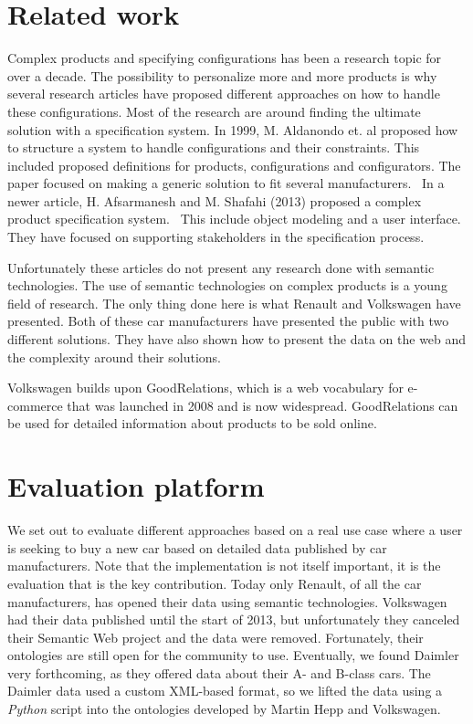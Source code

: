 \documentclass{llncs}
\begin{document}
\section{Related work}
Complex products and specifying configurations has been a research
topic for over a decade.  The possibility to personalize more and more
products is why several research articles have proposed different
approaches on how to handle these configurations. Most of the research
are around finding the ultimate solution with a specification
system. In 1999, M. Aldanondo et. al proposed how to structure a
system to handle configurations and their constraints. This included
proposed definitions for products, configurations and
configurators. The paper focused on making a generic solution to fit
several manufacturers.~\cite{OldConf} In a newer article,
H. Afsarmanesh and M. Shafahi (2013) proposed a complex product
specification system.~\cite{NewConf} This include object modeling and
a user interface. They have focused on supporting stakeholders in the
specification process.

Unfortunately these articles do not present any research done with
semantic technologies. The use of semantic technologies on complex
products is a young field of research. The only thing done here is
what Renault and Volkswagen have presented. Both of these car
manufacturers have presented the public with two different
solutions. They have also shown how to present the data on the web and
the complexity around their solutions.

Volkswagen builds upon GoodRelations\cite{GRQual}, which
is a web vocabulary for e-commerce that was launched in 2008 and is now
widespread.  GoodRelations can be used for detailed information about
products to be sold online.


\section{Evaluation platform}

We set out to evaluate different approaches based on a real use case
where a user is seeking to buy a new car based on detailed data
published by car manufacturers. Note that the implementation is not
itself important, it is the evaluation that is the key
contribution. Today only Renault, of all the car manufacturers, has
opened their data using semantic technologies. Volkswagen had their
data published until the start of 2013, but unfortunately they
canceled their Semantic Web project and the data were removed.
Fortunately, their ontologies are still open for the community to
use. Eventually, we found Daimler very forthcoming, as they offered
data about their A- and B-class cars.  The Daimler data used a custom
XML-based format, so we lifted the data using a \textit{Python} script into the
ontologies developed by Martin Hepp and Volkswagen.
\end{document}

